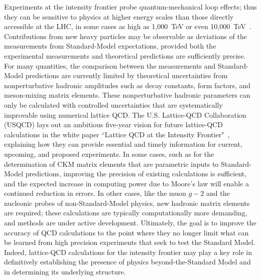 Experiments at the intensity frontier probe
quantum-mechanical loop effects; thus they can be sensitive to physics at
higher energy scales than those directly accessible at the LHC, in
some cases as high as 1,000~TeV or even 10,000~TeV~\cite{Isidori:2010kg}.  
Contributions from new heavy particles may be
observable as deviations of the measurements from Standard-Model
expectations, provided both the experimental measurements and
theoretical predictions are sufficiently precise.  For many quantities, the comparison between the measurements and Standard-Model predictions are currently limited by theoretical uncertainties from nonperturbative hadronic amplitudes such as decay constants, form 
factors, and meson-mixing matrix elements.  These nonperturbative hadronic parameters can only be calculated with controlled uncertainties that are systematically improvable using numerical lattice QCD.  The U.S. Lattice-QCD Collaboration (USQCD) lays out an ambitious five-year vision for future lattice-QCD calculations in the white paper ``Lattice QCD at the Intensity Frontier"~\cite{USQCD_IF_whitepaper13}, explaining how they can provide essential and timely information for current, upcoming, and proposed experiments.  
In some cases, such as for the determination of CKM matrix elements that are parametric inputs to
Standard-Model predictions, improving the precision of existing calculations is sufficient, and the expected
increase in computing power due to Moore's law will enable a continued reduction in errors.
In other cases, like the muon $g-2$ and the nucleonic probes of non-Standard-Model physics, new hadronic matrix elements
are required; these calculations are typically computationally more demanding, and methods are
under active development.  Ultimately, the goal is to improve the accuracy of QCD calculations to the point where they no longer limit what can be learned from high precision experiments that seek to test the Standard Model.  Indeed, lattice-QCD calculations for the intensity frontier
may play a key role in definitively establishing the presence of
physics beyond-the-Standard Model and in determining its underlying
structure.

